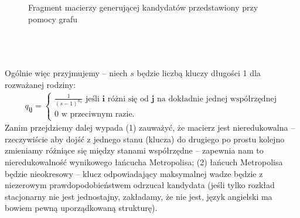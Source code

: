 \documentclass[a4paper]{article}
\theoremstyle{defn}
\theoremstyle{theorem}
\theoremstyle{lemma}
\theoremstyle{cor}
\theoremstyle{fact}
\begin{document}
\begin{figure}[h]
\caption{Fragment macierzy generującej kandydatów przedstawiony przy pomocy grafu}
\end{figure}
\\\\\\
Ogólnie więc przyjmujemy – niech $s$ będzie liczbą kluczy długości 1 dla rozważanej rodziny:\\
\begin{align*}
q_{\boldsymbol{ij}} = \begin{cases}
  \frac{1}{(s-1)^{n_k}} \,\, \text{jeśli $\boldsymbol{i}$ różni się od $\boldsymbol{j}$ na dokładnie jednej współrzędnej} \\
  0 \,\, \text{w przeciwnym razie.}
\end{cases}
\end{align*}
Zanim przejdziemy dalej wypada (1) zauważyć, że macierz jest nieredukowalna – rzeczywiście aby dojść z jednego stanu (klucza) do drugiego po prostu kolejno zmieniamy różniące się między stanami współrzędne – zapewnia nam to nieredukowalność wynikowego łańcucha Metropolisa; (2) łańcuch Metropolisa będzie nieokresowy – klucz odpowiadający maksymalnej wadze będzie z niezerowym prawdopodobieństwem odrzucał kandydata (jeśli tylko rozkład stacjonarny nie jest jednostajny, zakładamy, że nie jest, język angielski ma bowiem pewną uporządkowaną strukturę).
\end{document}
